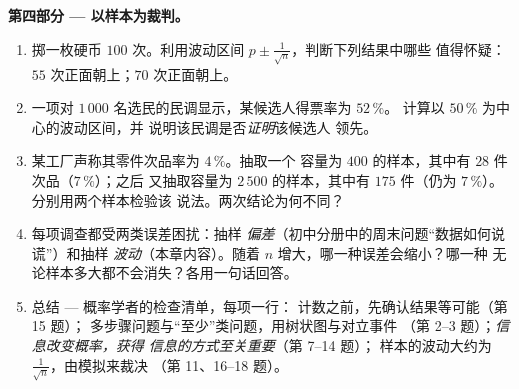 \begin{problem}
\medskip
\noindent\textbf{第四部分 --- 以样本为裁判。}
\begin{enumerate}[resume]
  \item 掷一枚硬币 $100$ 次。利用波动区间
        $p \pm \frac{1}{\sqrt n}$，判断下列结果中哪些
        值得怀疑：$55$ 次正面朝上；$70$
        次正面朝上。
  \item 一项对 $1\,000$ 名选民的民调显示，某候选人得票率为 $52\,\%$。
        计算以 $50\,\%$ 为中心的波动区间，并
        说明该民调是否\emph{证明}该候选人
        领先。
  \item 某工厂声称其零件次品率为 $4\,\%$。抽取一个
        容量为 $400$ 的样本，其中有 $28$ 件次品（$7\,\%$）；之后
        又抽取容量为 $2\,500$ 的样本，其中有 $175$ 件（仍为 $7\,\%$）。分别用两个样本检验该
        说法。两次结论为何不同？
  \item 每项调查都受两类误差困扰：抽样
        \emph{偏差}（初中分册中的周末问题“数据如何说谎”）和抽样
        \emph{波动}（本章内容）。随着
        $n$ 增大，哪一种误差会缩小？哪一种
        无论样本多大都不会消失？各用一句话回答。
  \item 总结 --- 概率学者的检查清单，每项一行：
        计数之前，先确认结果等可能（第 15 题）；
        多步骤问题与“至少”类问题，用树状图与对立事件
        （第 2--3 题）；\emph{信息改变概率，获得
        信息的方式至关重要}（第 7--14 题）；
        样本的波动大约为
        $\frac{1}{\sqrt n}$，由模拟来裁决
        （第 11、16--18 题）。
\end{enumerate}
\end{problem}
